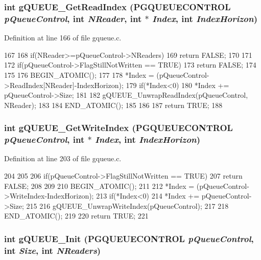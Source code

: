\subsubsection[{gQUEUE\_\-GetReadIndex}]{\setlength{\rightskip}{0pt plus 5cm}int gQUEUE\_\-GetReadIndex ({\bf PGQUEUECONTROL} {\em pQueueControl}, \/  int {\em NReader}, \/  int $\ast$ {\em Index}, \/  int {\em IndexHorizon})}\label{gqueue_8c_a273e65bb0fa92f17904f052a4def072d}


Definition at line 166 of file gqueue.c.


\begin{DoxyCode}
167 {
168         if(NReader>=pQueueControl->NReaders){
169                 return FALSE;
170         }
171 
172         if(pQueueControl->FlagStillNotWritten == TRUE){
173                 return FALSE;
174         }
175     
176 BEGIN_ATOMIC();
177 
178         *Index = (pQueueControl->ReadIndex[NReader]-IndexHorizon);
179         if(*Index<0){
180                 *Index += pQueueControl->Size;
181         }
182         gQUEUE_UnwrapReadIndex(pQueueControl, NReader);
183 
184 END_ATOMIC();
185 
186 
187     return TRUE;
188 }                      
\end{DoxyCode}
\subsubsection[{gQUEUE\_\-GetWriteIndex}]{\setlength{\rightskip}{0pt plus 5cm}int gQUEUE\_\-GetWriteIndex ({\bf PGQUEUECONTROL} {\em pQueueControl}, \/  int $\ast$ {\em Index}, \/  int {\em IndexHorizon})}\label{gqueue_8c_ae52e32b31c201f0ffc5134e30a4056ba}


Definition at line 203 of file gqueue.c.


\begin{DoxyCode}
204 {
205 
206     if(pQueueControl->FlagStillNotWritten == TRUE){
207         return FALSE;
208     }
209 
210 BEGIN_ATOMIC();
211     
212         *Index = (pQueueControl->WriteIndex-IndexHorizon);
213         if(*Index<0){
214                 *Index += pQueueControl->Size;
215         }
216         gQUEUE_UnwrapWriteIndex(pQueueControl);
217 
218 END_ATOMIC();
219 
220     return TRUE;
221 }                      
\end{DoxyCode}
\subsubsection[{gQUEUE\_\-Init}]{\setlength{\rightskip}{0pt plus 5cm}int gQUEUE\_\-Init ({\bf PGQUEUECONTROL} {\em pQueueControl}, \/  int {\em Size}, \/  int {\em NReaders})}\label{gqueue_8c_a6edb74779d40a7a4328e32012fad8c0c}


